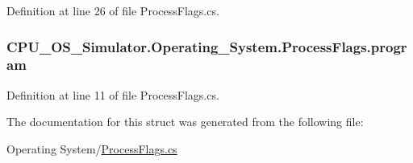 Definition at line 26 of file Process\+Flags.\+cs.

\hypertarget{struct_c_p_u___o_s___simulator_1_1_operating___system_1_1_process_flags_addf9316ebaddcec9f466b0317d15d45c}{}
\subsubsection[{program}]{ C\+P\+U\+\_\+\+O\+S\+\_\+\+Simulator.\+Operating\+\_\+\+System.\+Process\+Flags.\+program}\label{struct_c_p_u___o_s___simulator_1_1_operating___system_1_1_process_flags_addf9316ebaddcec9f466b0317d15d45c}


Definition at line 11 of file Process\+Flags.\+cs.



The documentation for this struct was generated from the following file\+:\begin{DoxyCompactItemize}
\item 
Operating System/\hyperlink{_process_flags_8cs}{Process\+Flags.\+cs}\end{DoxyCompactItemize}
